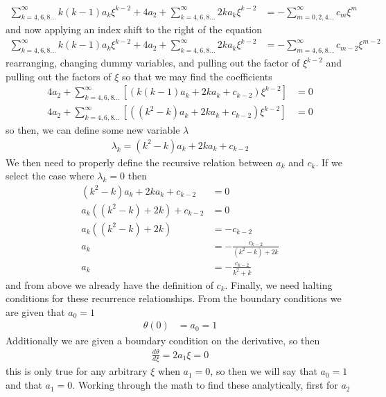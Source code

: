 \begin{align*}
    \sum_{k=4,6,8...}^{\infty}k(k-1)a_{k}\xi^{k-2} + 4a_{2}+ \sum_{k=4,6,8...}^{\infty}2ka_{k}\xi^{k-2} &= -\sum_{m=0,2,4...}^{\infty}c_{m}\xi^{m}
\end{align*}
and now applying an index shift to the right of the equation
\begin{align*}
   \sum_{k=4,6,8...}^{\infty}k(k-1)a_{k}\xi^{k-2} + 4a_{2}+ \sum_{k=4,6,8...}^{\infty}2ka_{k}\xi^{k-2} &= -\sum_{m=4,6,8...}^{\infty}c_{m-2}\xi^{m-2}
\end{align*}
rearranging, changing dummy variables, and pulling out the factor of $\xi^{k-2}$ and pulling out the factors of $\xi$ so that we may find the coefficients
\begin{align*}
    4a_{2}+\sum_{k=4,6,8...}^{\infty}\left[\left(k(k-1)a_{k} + 2ka_{k}+c_{k-2}\right)\xi^{k-2}\right] &= 0 \\
    4a_{2}+\sum_{k=4,6,8...}^{\infty}\left[\left((k^{2}-k)a_{k} + 2ka_{k}+c_{k-2}\right)\xi^{k-2}\right] &= 0
\end{align*}
so then, we can define some new variable $\lambda$
\begin{align*}
    \lambda_{k} = (k^{2}-k)a_{k} + 2ka_{k}+c_{k-2}
\end{align*}
We then need to properly define the recursive relation between $a_{k}$ and $c_{k}$. If we select the case where $\lambda_{k} = 0$ then
\begin{align*}
    (k^{2}-k)a_{k} + 2ka_{k}+c_{k-2} &= 0 \\
    a_{k}\left((k^{2}-k) + 2k\right)+c_{k-2} &= 0 \\
    a_{k}\left((k^{2}-k) + 2k\right) &= -c_{k-2} \\
    a_{k} &= -\frac{c_{k-2}}{(k^{2}-k) + 2k} \\
    a_{k} &= -\frac{c_{k-2}}{k^{2}+k}
\end{align*}
and from above we already have the definition of $c_{k}$. Finally, we need halting conditions for these recurrence relationships. From the boundary conditions we are given that $a_{0} = 1$
\begin{align*}
    \theta(0) &= a_{0} = 1 
\end{align*}
Additionally we are given a boundary condition on the derivative, so then
\begin{align*}
    \frac{d\theta}{d\xi} = 2a_{1}\xi = 0
\end{align*}
this is only true for any arbitrary $\xi$ when $a_{1} = 0$, so then we will say that $a_{0} = 1$ and that $a_{1} = 0$. Working through the math to find these analytically, first for $a_{2}$

